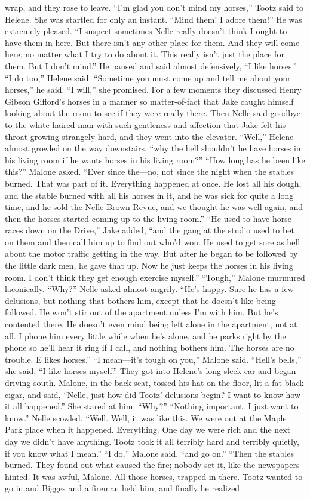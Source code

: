 \documentclass{novel}
\begin{document}
wrap, and they rose to leave. “I’m glad you don’t mind my horses,” Tootz said to Helene. She was startled for only an instant. “Mind them! I adore them!” He was extremely pleased. “I suspect sometimes Nelle really doesn’t think I ought to have them in here. But there isn’t any other place for them. And they will come here, no matter what I try to do about it. This really isn’t just the place for them. But I don’t mind.” He paused and said almost defensively, “I like horses.” “I do too,” Helene said. “Sometime you must come up and tell me about your horses,” he said. “I will,” she promised. For a few moments they discussed Henry Gibson Gifford’s horses in a manner so matter-of-fact that Jake caught himself looking about the room to see if they were really there. Then Nelle said goodbye to the white-haired man with such gentleness and affection that Jake felt his throat growing strangely hard, and they went into the elevator. “Well,” Helene almost growled on the way downstairs, “why the hell shouldn’t he have horses in his living room if he wants horses in his living room?” “How long has he been like this?” Malone asked. “Ever since the—no, not since the night when the stables burned. That was part of it. Everything happened at once. He lost all his dough, and the stable burned with all his horses in it, and he was sick for quite a long time, and he sold the Nelle Brown Revue, and we thought he was well again, and then the horses started coming up to the living room.” “He used to have horse races down on the Drive,” Jake added, “and the gang at the studio used to bet on them and then call him up to find out who’d won. He used to get sore as hell about the motor traffic getting in the way. But after he began to be followed by the little dark men, he gave that up. Now he just keeps the horses in his living room. I don’t think they get enough exercise myself.” “Tough,” Malone murmured laconically. “Why?” Nelle asked almost angrily. “He’s happy. Sure he has a few delusions, but nothing that bothers him, except that he doesn’t like being followed. He won’t stir out of the apartment unless I’m with him. But he’s contented there. He doesn’t even mind being left alone in the apartment, not at all. I phone him every little while when he’s alone, and he parks right by the phone so he’ll hear it ring if I call, and nothing bothers him. The horses are no trouble. E likes horses.” “I mean—it’s tough on you,” Malone said. “Hell’s bells,” she said, “I like horses myself.” They got into Helene’s long sleek car and began driving south. Malone, in the back seat, tossed his hat on the floor, lit a fat black cigar, and said, “Nelle, just how did Tootz’ delusions begin? I want to know how it all happened.” She stared at him. “Why?” “Nothing important. I just want to know.” Nelle scowled. “Well. Well, it was like this. We were out at the Maple Park place when it happened. Everything. One day we were rich and the next day we didn’t have anything. Tootz took it all terribly hard and terribly quietly, if you know what I mean.” “I do,” Malone said, “and go on.” “Then the stables burned. They found out what caused the fire; nobody set it, like the newspapers hinted. It was awful, Malone. All those horses, trapped in there. Tootz wanted to go in and Bigges and a fireman held him, and finally he realized 
\end{document}
